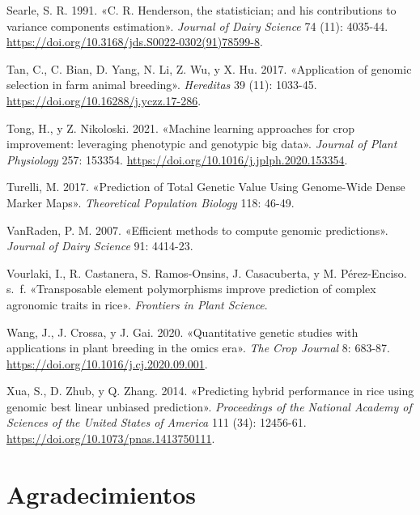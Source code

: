 \documentclass[11pt,spanish,a4paper,oneside,]{book} %
\begin{document}
\leavevmode\hypertarget{ref-cite:29}{}%
Searle, S. R. 1991. «C. R. Henderson, the statistician; and his contributions to variance components estimation». \emph{Journal of Dairy Science} 74 (11): 4035-44. \url{https://doi.org/10.3168/jds.S0022-0302(91)78599-8}.

\leavevmode\hypertarget{ref-cite:34}{}%
Tan, C., C. Bian, D. Yang, N. Li, Z. Wu, y X. Hu. 2017. «Application of genomic selection in farm animal breeding». \emph{Hereditas} 39 (11): 1033-45. \url{https://doi.org/10.16288/j.yczz.17-286}.

\leavevmode\hypertarget{ref-cite:7}{}%
Tong, H., y Z. Nikoloski. 2021. «Machine learning approaches for crop improvement: leveraging phenotypic and genotypic big data». \emph{Journal of Plant Physiology} 257: 153354. \url{https://doi.org/10.1016/j.jplph.2020.153354}.

\leavevmode\hypertarget{ref-cite:9}{}%
Turelli, M. 2017. «Prediction of Total Genetic Value Using Genome-Wide Dense Marker Maps». \emph{Theoretical Population Biology} 118: 46-49.

\leavevmode\hypertarget{ref-cite:39}{}%
VanRaden, P. M. 2007. «Efficient methods to compute genomic predictions». \emph{Journal of Dairy Science} 91: 4414-23.

\leavevmode\hypertarget{ref-cite:26}{}%
Vourlaki, I., R. Castanera, S. Ramos-Onsins, J. Casacuberta, y M. Pérez-Enciso. s.~f. «Transposable element polymorphisms improve prediction of complex agronomic traits in rice». \emph{Frontiers in Plant Science}.

\leavevmode\hypertarget{ref-cite:46}{}%
Wang, J., J. Crossa, y J. Gai. 2020. «Quantitative genetic studies with applications in plant breeding in the omics era». \emph{The Crop Journal} 8: 683-87. \url{https://doi.org/10.1016/j.cj.2020.09.001}.

\leavevmode\hypertarget{ref-cite:25}{}%
Xua, S., D. Zhub, y Q. Zhang. 2014. «Predicting hybrid performance in rice using genomic best linear unbiased prediction». \emph{Proceedings of the National Academy of Sciences of the United States of America} 111 (34): 12456-61. \url{https://doi.org/10.1073/pnas.1413750111}.

\endgroup

\hypertarget{agradecimientos}{%
\chapter*{Agradecimientos}\label{agradecimientos}}
\end{document}
